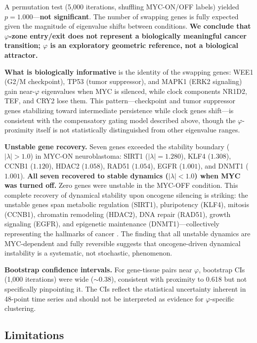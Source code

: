 \documentclass[11pt,letterpaper]{article}
\begin{document}
A permutation test (5{,}000 iterations, shuffling MYC-ON/OFF labels) yielded $p = 1.000$---\textbf{not significant}. The number of swapping genes is fully expected given the magnitude of eigenvalue shifts between conditions. \textbf{We conclude that $\varphi$-zone entry/exit does not represent a biologically meaningful cancer transition; $\varphi$ is an exploratory geometric reference, not a biological attractor.}

\textbf{What is biologically informative} is the identity of the swapping genes: WEE1 (G2/M checkpoint), TP53 (tumor suppressor), and MAPK1 (ERK2 signaling) gain near-$\varphi$ eigenvalues when MYC is silenced, while clock components NR1D2, TEF, and CRY2 lose them. This pattern---checkpoint and tumor suppressor genes stabilizing toward intermediate persistence while clock genes shift---is consistent with the compensatory gating model described above, though the $\varphi$-proximity itself is not statistically distinguished from other eigenvalue ranges.

\textbf{Unstable gene recovery.} Seven genes exceeded the stability boundary ($|\lambda| > 1.0$) in MYC-ON neuroblastoma: SIRT1 ($|\lambda| = 1.280$), KLF4 ($1.308$), CCNB1 ($1.120$), HDAC2 ($1.058$), RAD51 ($1.054$), EGFR ($1.001$), and DNMT1 ($1.001$). \textbf{All seven recovered to stable dynamics ($|\lambda| < 1.0$) when MYC was turned off.} Zero genes were unstable in the MYC-OFF condition. This complete recovery of dynamical stability upon oncogene silencing is striking: the unstable genes span metabolic regulation (SIRT1), pluripotency (KLF4), mitosis (CCNB1), chromatin remodeling (HDAC2), DNA repair (RAD51), growth signaling (EGFR), and epigenetic maintenance (DNMT1)---collectively representing the hallmarks of cancer \citep{hanahan2011}. The finding that all unstable dynamics are MYC-dependent and fully reversible suggests that oncogene-driven dynamical instability is a systematic, not stochastic, phenomenon.

\textbf{Bootstrap confidence intervals.} For gene-tissue pairs near $\varphi$, bootstrap CIs (1{,}000 iterations) were wide ($\sim$0.38), consistent with proximity to 0.618 but not specifically pinpointing it. The CIs reflect the statistical uncertainty inherent in 48-point time series and should not be interpreted as evidence for $\varphi$-specific clustering.

\subsection{Limitations}
\end{document}

